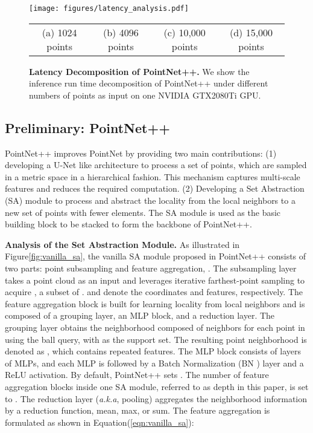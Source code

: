 \documentclass{article}
\newcommand{\figLabel}{Figure\xspace}
\newcommand{\eqnLabel}{Equation\xspace}
\newcommand{\eqnref}[1]{(\ref{#1})}
\newcommand{\mysection}[1]{\vspace{3pt}\noindent\textbf{#1.}}
\begin{document}
\begin{figure*}[t]
\begin{center}
\texttt{[image: figures/latency\_analysis.pdf]}
\end{center}
\vspace{-3mm}
\setlength{\tabcolsep}{7mm}
\begin{tabular}{cccc}
(a) 1024 points & 
(b) 4096 points & 
(c) 10,000 points &
(d) 15,000 points 
\end{tabular}
\caption{\textbf{Latency Decomposition of PointNet++.} We show the inference run time decomposition of PointNet++ under different numbers of points as input on one NVIDIA GTX2080Ti GPU. 
}
\label{fig:latency_pointnet++}
\end{figure*}

\subsection{Preliminary: PointNet++} \label{sec:pointnet++}
PointNet++ \cite{Qi2017PointNetDH} improves PointNet \cite{Qi2017PointNetDL} by providing two main contributions: 
(1) developing a U-Net \cite{Ronneberger15unet} like architecture to process a set of points, which are sampled in a metric space in a hierarchical fashion. This mechanism captures multi-scale features and reduces the required computation.
(2) Developing a Set Abstraction (SA) module to process and abstract the locality from the local neighbors to a new set of points with fewer elements. The SA module is used as the basic building block to be stacked to form the backbone of PointNet++. 

\mysection{Analysis of the Set Abstraction Module}
As illustrated in \figLabel \ref{fig:vanilla_sa}, the vanilla SA module proposed in PointNet++ consists of two parts: point subsampling and feature aggregation, .  
The subsampling layer takes a point cloud  as an input and leverages iterative farthest-point sampling to acquire , a subset of .  and  denote the coordinates and features, respectively. 
The feature aggregation block is built for learning locality from local neighbors and is composed of a grouping layer, an MLP block, and a reduction layer. The grouping layer obtains the neighborhood composed of  neighbors for each point in  using the ball query, with  as the support set. The resulting point neighborhood is denoted as , which contains  repeated features. 
The MLP block consists of  layers of MLPs, and each MLP is followed by a Batch Normalization (BN \cite{DBLP:conf/icml/IoffeS15}) layer and a ReLU activation. By default, PointNet++ sets . The number of feature aggregation blocks inside one SA module, referred to as depth  in this paper, is set to . The reduction layer (\textit{a.k.a}, pooling) aggregates the neighborhood information by a reduction function, \eg mean, max, or sum. The feature aggregation is formulated as shown in \eqnLabel \eqnref{eqn:vanilla_sa}:
\end{document}
